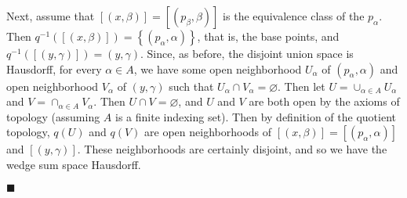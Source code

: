 \documentclass[12pt]{article}
\renewcommand{\qed}{\hfill$\blacksquare$}
\renewenvironment{proof}{\begin{addmargin}[1em]{0em}\begin{newproof}}{\end{newproof}\end{addmargin}\qed}
\begin{document}
\begin{proof}
Next, assume that $\left[\left(x,\beta\right)\right]=\left[\left(p_{\beta},\beta\right)\right]$ is the equivalence class of the $p_{\alpha}$. Then $q^{-1}\left(\left[\left(x,\beta\right)\right]\right) = \left\{ \left(p_{\alpha},\alpha\right) \right\}$, that is, the base points, and $q^{-1}\left(\left[\left(y,\gamma\right)\right]\right) = \left(y,\gamma\right)$. Since, as before, the disjoint union space is Hausdorff, for every $\alpha \in A$, we have some open neighborhood $U_{\alpha}$ of $\left(p_{\alpha},\alpha\right)$ and open neighborhood $V_{\alpha}$ of $\left(y,\gamma\right)$ such that $U_{\alpha}\cap V_{\alpha}=\varnothing$. Then let $U = \cup_{\alpha \in A} U_{\alpha}$ and $V = \cap_{\alpha \in A} V_{\alpha}$. Then $U\cap V=\varnothing$, and $U$ and $V$ are both open by the axioms of topology (assuming $A$ is a finite indexing set). Then by definition of the quotient topology, $q\left(U\right)$ and $q\left(V\right)$ are open neighborhoods of $\left[\left(x,\beta\right)\right]=\left[\left(p_{\alpha},\alpha\right)\right]$ and $\left[\left(y,\gamma\right)\right]$. These neighborhoods are certainly disjoint, and so we have the wedge sum space Hausdorff.
\end{proof}
\end{document}
